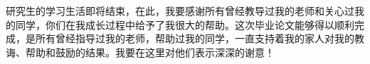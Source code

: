 
研究生的学习生活即将结束，在此，我要感谢所有曾经教导过我的老师和关心过我的同学，你们在我成长过程中给予了我很大的帮助。这次毕业论文能够得以顺利完成，是所有曾经指导过我的老师，帮助过我的同学，一直支持着我的家人对我的教诲、帮助和鼓励的结果。我要在这里对他们表示深深的谢意！